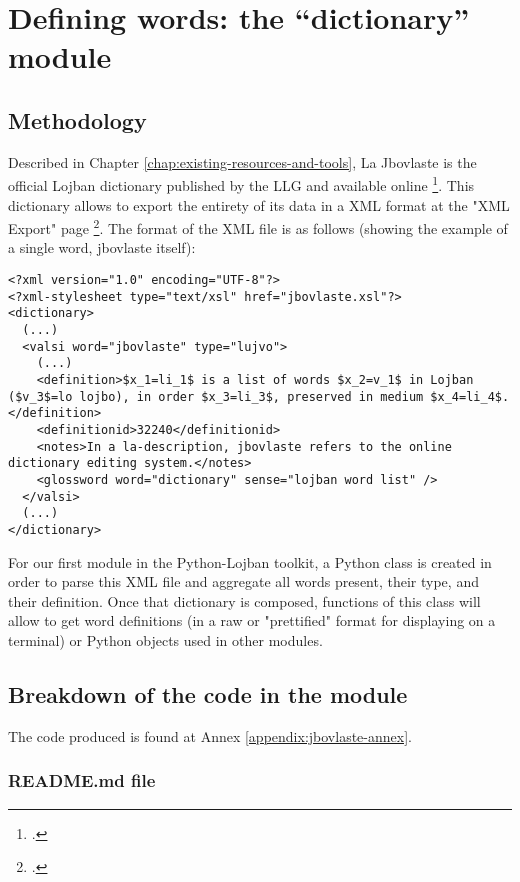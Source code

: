 \chapter{Defining words: the ``dictionary'' module}
\label{chap:creating_a_dictionary}

\section{Methodology}

Described in Chapter \ref{chap:existing-resources-and-tools}, La Jbovlaste is the official Lojban dictionary published by the LLG and available online \footcite{jbovlaste}.
This dictionary allows to export the entirety of its data in a XML format at the "XML Export" page \footcite{jbovlaste-export}.
The format of the XML file is as follows (showing the example of a single word, jbovlaste itself):

\begin{lstlisting}[caption=Example of word as defined in the official Lojban dictionary XML export]
<?xml version="1.0" encoding="UTF-8"?>
<?xml-stylesheet type="text/xsl" href="jbovlaste.xsl"?>
<dictionary>
  (...)
  <valsi word="jbovlaste" type="lujvo">
    (...)
    <definition>$x_1=li_1$ is a list of words $x_2=v_1$ in Lojban ($v_3$=lo lojbo), in order $x_3=li_3$, preserved in medium $x_4=li_4$.</definition>
    <definitionid>32240</definitionid>
    <notes>In a la-description, jbovlaste refers to the online dictionary editing system.</notes>
    <glossword word="dictionary" sense="lojban word list" />
  </valsi>
  (...)
</dictionary>
\end{lstlisting}

For our first module in the Python-Lojban toolkit, a Python class is created in order to parse this XML file and aggregate all words present,
their type, and their definition. Once that dictionary is composed, functions of this class will allow to get word definitions (in a raw or "prettified"
format for displaying on a terminal) or Python objects used in other modules.

\section{Breakdown of the code in the module}

The code produced is found at Annex \ref{appendix:jbovlaste-annex}.

\subsection*{README.md file}


